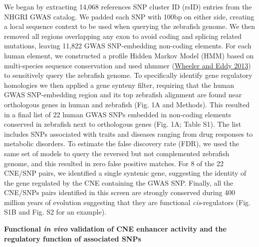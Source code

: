 \documentclass[]{article}
\begin{document}
We began by extracting 14,068 references SNP cluster ID (rsID) entries
from the NHGRI GWAS catalog. We padded each SNP with 100bp on either
side, creating a local sequence context to be used when querying the
zebrafish genome. We then removed all regions overlapping any exon to
avoid coding and splicing related mutations, leaving 11,822 GWAS
SNP-embedding non-coding elements. For each human element, we
constructed a profile Hidden Markov Model (HMM) based on multi-species
sequence conservation and used nhmmer
(\protect\hyperlink{_ENREF_35}{Wheeler and Eddy 2013}) to sensitively
query the zebrafish genome. To specifically identify gene regulatory
homologies we then applied a gene synteny filter, requiring that the
human GWAS SNP-embedding region and its top zebrafish alignment are
found near orthologous genes in human and zebrafish (Fig. 1A and
Methods). This resulted in a final list of 22 human GWAS SNPs embedded
in non-coding elements conserved in zebrafish next to orthologous genes
(Fig. 1A; Table S1). The list includes SNPs associated with traits and
diseases ranging from drug responses to metabolic disorders. To estimate
the false discovery rate (FDR), we used the same set of models to query
the reversed but not complemented zebrafish genome, and this resulted in
zero false positive matches. For 8 of the 22 CNE/SNP pairs, we
identified a single syntenic gene, suggesting the identity of the gene
regulated by the CNE containing the GWAS SNP. Finally, all the CNE/SNPs
pairs identified in this screen are strongly conserved during 400
million years of evolution suggesting that they are functional
\emph{cis}-regulators (Fig. S1B and Fig. S2 for an example).

\textbf{Functional \emph{in vivo} validation of CNE enhancer activity
and the regulatory function of associated SNPs}
\end{document}
